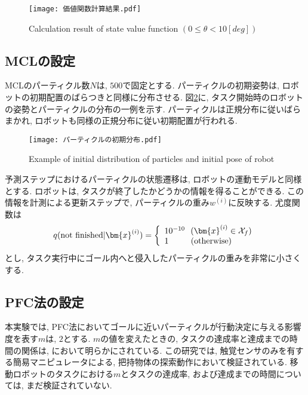 \begin{figure}[h]
  \begin{center}
    \texttt{[image: 価値関数計算結果.pdf]}
    \caption{Calculation result of state value function $(0 \leq \theta < 10 \si{[deg]})$}
    \label{fig:価値関数計算結果}
  \end{center}
\end{figure}

\subsection{MCLの設定}
MCLのパーティクル数$N$は, $500$で固定とする. 
パーティクルの初期姿勢は, ロボットの初期配置のばらつきと同様に分布させる. 
図\ref{fig:パーティクルの初期分布}に, タスク開始時のロボットの姿勢とパーティクルの分布の一例を示す. 
パーティクルは正規分布に従いばらまかれ, ロボットも同様の正規分布に従い初期配置が行われる. 

\begin{figure}[h]
  \begin{center}
    \texttt{[image: パーティクルの初期分布.pdf]}
    \caption{Example of initial distribution of particles and initial pose of robot}
    \label{fig:パーティクルの初期分布}
  \end{center}
\end{figure}

予測ステップにおけるパーティクルの状態遷移は, ロボットの運動モデルと同様とする. 
ロボットは, タスクが終了したかどうかの情報を得ることができる. 
この情報を計測による更新ステップで, パーティクルの重み$w^{(i)}$に反映する. 
尤度関数は
\begin{equation}
  q({\rm not \  finished} | \bm{x}^{(i)}) =
  \left\{
    \begin{array}{l}
      10^{-10} \ \ (\bm{x}^{(i)} \in \mathcal{X}_{f}) \\
      1 \quad \quad \ \ ({\rm otherwise})
    \end{array}
  \right.
\end{equation}
とし, タスク実行中にゴール内へと侵入したパーティクルの重みを非常に小さくする. 

\subsection{PFC法の設定}
本実験では, PFC法においてゴールに近いパーティクルが行動決定に与える影響度を表す$m$は, $2$とする. 
$m$の値を変えたときの, タスクの達成率と達成までの時間の関係は, \cite{ueda2018searching}において明らかにされている. 
この研究では, 触覚センサのみを有する簡易マニピュレータによる, 把持物体の探索動作において検証されている. 
移動ロボットのタスクにおける$m$とタスクの達成率, および達成までの時間については, まだ検証されていない. 

